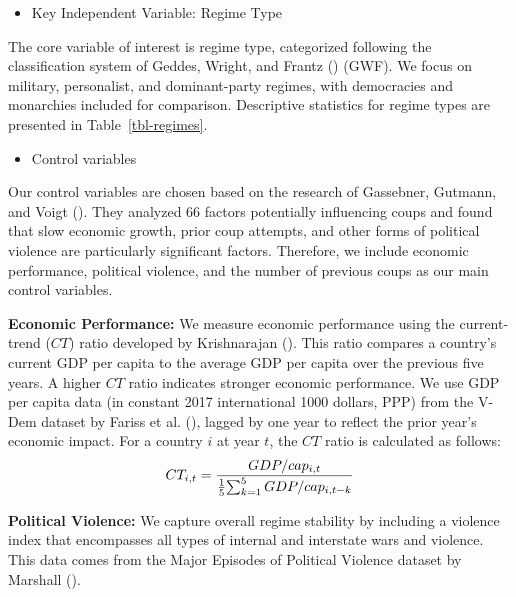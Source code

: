\documentclass[
  12pt,
]{report}
\providecommand{\tightlist}{%
  \setlength{\itemsep}{0pt}\setlength{\parskip}{0pt}}\usepackage{longtable,booktabs,array}
\begin{document}
\begin{itemize}
\tightlist
\item
  Key Independent Variable: Regime Type
\end{itemize}

The core variable of interest is regime type, categorized following the
classification system of Geddes, Wright, and Frantz
() (GWF). We focus on military,
personalist, and dominant-party regimes, with democracies and monarchies
included for comparison. Descriptive statistics for regime types are
presented in Table~\ref{tbl-regimes}.

\begin{itemize}
\tightlist
\item
  Control variables
\end{itemize}

Our control variables are chosen based on the research of Gassebner,
Gutmann, and Voigt (). They analyzed
66 factors potentially influencing coups and found that slow economic
growth, prior coup attempts, and other forms of political violence are
particularly significant factors. Therefore, we include economic
performance, political violence, and the number of previous coups as our
main control variables.

\textbf{Economic Performance:} We measure economic performance using the
current-trend (\(CT\)) ratio developed by Krishnarajan
(). This ratio compares a country's
current GDP per capita to the average GDP per capita over the previous
five years. A higher \(CT\) ratio indicates stronger economic
performance. We use GDP per capita data (in constant 2017 international
1000 dollars, PPP) from the V-Dem dataset by Fariss et al.
(), lagged by one year to reflect the
prior year's economic impact. For a country \(i\) at year \(t\), the
\(CT\) ratio is calculated as follows: \[
\begin{aligned}
CT_{i,t} = {GDP/cap_{i,t} \over {1 \over 5} {\sum_{k=1}^5GDP/cap_{i,t-k}}}
\end{aligned}
\]

\textbf{Political Violence:} We capture overall regime stability by
including a violence index that encompasses all types of internal and
interstate wars and violence. This data comes from the Major Episodes of
Political Violence dataset by Marshall
().
\end{document}
